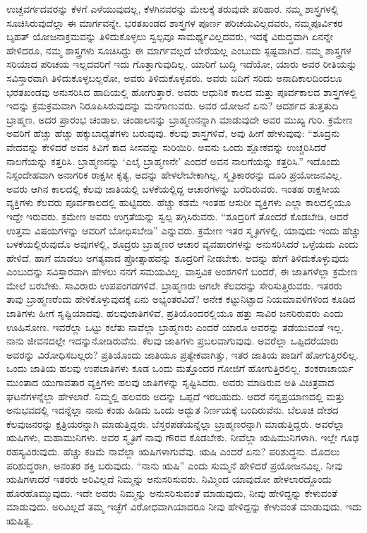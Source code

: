 ಉಚ್ಚವರ್ಗದವರನ್ನು ಕೆಳಗೆ ಎಳೆಯುವುದಲ್ಲ, ಕೆಳಗಿನವರನ್ನು ಮೇಲಕ್ಕೆ ತರುವುದೇ ಪರಿಹಾರ. ನಮ್ಮ ಶಾಸ್ತ್ರಗಳಲ್ಲಿ ಸೂಚಿಸಿರುವುದೆಲ್ಲಾ ಈ ಮಾರ್ಗವನ್ನೇ. ಭರತಖಂಡದ ಶಾಸ್ತ್ರಗಳ ಪೂರ್ಣ ಪರಿಚಯವಿಲ್ಲದವರು, ನಮ್ಮ\break ಪೂರ್ವಿಕರ ಬೃಹತ್​ ಯೋಜನಾಕ್ರಮವನ್ನು ತಿಳಿದುಕೊಳ್ಳಲು ಸ್ವಲ್ಪವೂ ಸಾಮರ್ಥ್ಯವಿಲ್ಲದವರು, ಇದಕ್ಕೆ ವಿರುದ್ಧವಾಗಿ ಏನನ್ನೇ ಹೇಳಿದರೂ, ನಮ್ಮ ಶಾಸ್ತ್ರಗಳು ಸೂಚಿಸಿದ್ದು ಈ ಮಾರ್ಗವಲ್ಲದೆ ಬೇರೆಯಲ್ಲ ಎಂಬುದು ಸ್ಪಷ್ಟವಾಗಿದೆ. ನಮ್ಮ ಶಾಸ್ತ್ರಗಳ ಸರಿಯಾದ ಪರಿಚಯ ಇಲ್ಲದವರಿಗೆ ಇದು ಗೊತ್ತಾಗುವುದಿಲ್ಲ. ಯಾರಿಗೆ ಬುದ್ಧಿ ಇದೆಯೋ, ಯಾರು ಅವರ ರೀತಿಯನ್ನು ಸವಿಸ್ತಾರವಾಗಿ ತಿಳಿದುಕೊಳ್ಳಬಲ್ಲರೋ, ಅವರು ತಿಳಿದುಕೊಳ್ಳವರು. ಅವರು ಬದಿಗೆ ಸರಿದು ಅನಾದಿಕಾಲದಿಂದಲೂ ಭರತಖಂಡವು ಅನುಸರಿಸಿದ ಹಾದಿಯಲ್ಲಿ ಹೋಗುತ್ತಾರೆ. ಅವರು ಆಧುನಿಕ ಕಾಲದ ಮತ್ತು ಪೂರ್ವಕಾಲದ ಶಾಸ್ತ್ರಗಳಲ್ಲಿ ಇದನ್ನು ಕ್ರಮಕ್ರಮವಾಗಿ ನಿರೂಪಿಸಿರುವುದನ್ನು ಮನಗಾಣುವರು. ಅವರ ಯೋಜನೆ ಏನು? ಆದರ್ಶದ ತುತ್ತತುದಿ ಬ್ರಾಹ್ಮಣ. ಅದರ ಪ್ರಾರಂಭ ಚಂಡಾಲ. ಚಂಡಾಲನನ್ನು ಬ್ರಾಹ್ಮಣನನ್ನಾಗಿ ಮಾಡುವುದೇ ಅವರ ಮುಖ್ಯ ಗುರಿ. ಕ್ರಮೇಣ ಅವರಿಗೆ ಹೆಚ್ಚು ಹೆಚ್ಚು ಹಕ್ಕುಬಾಧ್ಯತೆಗಳು ಬರುವುವು. ಕೆಲವು ಶಾಸ್ತ್ರಗಳಿವೆ, ಅವು ಹೀಗೆ ಹೇಳುವುವು: “ಶೂದ್ರನು ವೇದವನ್ನು ಕೇಳಿದರೆ ಅವನ ಕಿವಿಗೆ ಕಾದ ಸೀಸವನ್ನು ಸುರಿಯಿರಿ. ಅವನು ಒಂದು ಶ್ಲೋಕವನ್ನು ಉಚ್ಚರಿಸಿದರೆ ನಾಲಗೆಯನ್ನು ಕತ್ತರಿಸಿ. ಬ್ರಾಹ್ಮಣನನ್ನು ‘ಎಲೈ ಬ್ರಾಹ್ಮಣನೇ’ ಎಂದರೆ ಅವನ ನಾಲಗೆಯನ್ನು ಕತ್ತರಿಸಿ.” ಇದೊಂದು ನಿಸ್ಸಂದೇಹವಾಗಿ ಅನಾಗರಿಕ ರಾಕ್ಷಸೀ ಕೃತ್ಯ, ಅದನ್ನು ಹೇಳಲೇಬೇಕಾಗಿಲ್ಲ. ಸ್ಮೃತಿಕಾರರನ್ನು ದೂರಿ ಪ್ರಯೋಜನವಿಲ್ಲ. ಅವರು ಆಗಿನ ಕಾಲದಲ್ಲಿ ಕೆಲವು ಜಾತಿಯಲ್ಲಿ ಬಳಕೆಯಲ್ಲಿದ್ದ ಆಚಾರಗಳನ್ನು ಬರೆದಿರುವರು. ಇಂತಹ ರಾಕ್ಷಸೀಯ ವ್ಯಕ್ತಿಗಳು ಕೆಲವರು ಪೂರ್ವಕಾಲದಲ್ಲಿ ಹುಟ್ಟಿದರು. ಹೆಚ್ಚು ಕಡಮೆ ಇಂತಹ ಆಸುರೀ ವ್ಯಕ್ತಿಗಳು ಎಲ್ಲಾ ಕಾಲದಲ್ಲಿಯೂ ಇದ್ದೇ ಇರುವರು. ಕ್ರಮೇಣ ಅವರು ಉಗ್ರತೆಯನ್ನು ಸ್ವಲ್ಪ ತಗ್ಗಿಸಿರುವರು. “ಶೂದ್ರರಿಗೆ ತೊಂದರೆ ಕೊಡಬೇಡಿ, ಆದರೆ ಉತ್ತಮ ವಿಷಯಗಳನ್ನು ಆವರಿಗೆ ಬೋಧಿಸಬೇಡಿ” ಎನ್ನುವರು. ಕ್ರಮೇಣ ಇತರ ಸ್ಮೃತಿಗಳಲ್ಲಿ, ಯಾವುದು ಇಂದು ಹೆಚ್ಚು ಬಳಕೆಯಲ್ಲಿರುವುದೊ ಅವುಗಳಲ್ಲಿ, ಶೂದ್ರರು ಬ್ರಾಹ್ಮಣರ ಆಚಾರ ವ್ಯವಹಾರಗಳನ್ನು ಅನುಸರಿಸಿದರೆ ಒಳ್ಳೆಯದು ಎಂದು ಹೇಳಿದೆ. ಹಾಗೆ ಮಾಡಲು ಅಗತ್ಯವಾದ ಪ್ರೋತ್ಸಾಹವನ್ನು ಶೂದ್ರರಿಗೆ ನೀಡಬೇಕು. ಅದನ್ನು ಹೇಗೆ ತಿಳಿದುಕೊಳ್ಳುವುದು ಎಂಬುದನ್ನು ಸವಿಸ್ತಾರವಾಗಿ ಹೇಳಲು ನನಗೆ ಸಮಯವಿಲ್ಲ. ವಾಸ್ತವಿಕ ಅಂಶಗಳಿಗೆ ಬಂದರೆ, ಈ ಜಾತಿಗಳೆಲ್ಲಾ ಕ್ರಮೇಣ ಮೇಲೆ ಬರಬೇಕು. ಸಾವಿರಾರು ಉಪಪಂಗಡಗಳಿವೆ. ಬ್ರಾಹ್ಮಣರು ಆಗಲೇ ಕೆಲವರನ್ನು ಸೇರಿಸುತ್ತಿರುವರು. ಇತರರು ತಾವು ಬ್ರಾಹ್ಮಣರೆಂದು ಹೇಳಿಕೊಳ್ಳುವುದಕ್ಕೆ ಏನು ಅಭ್ಯಂತರವಿದೆ? ಅನೇಕ ಕಟ್ಟುನಿಟ್ಟಾದ ನಿಯಮಾವಳಿಗಳಿಂದ ಕೂಡಿದ ಜಾತಿಗಳು ಹೀಗೆ ಸೃಷ್ಟಿಯಾದವು. ಹಲವು\break ಜಾತಿಗಳಿವೆ, ಪ್ರತಿಯೊಂದರಲ್ಲಿಯೂ ಹತ್ತು ಸಾವಿರ ಜನರಿರುವರು ಎಂದು ಊಹಿಸೋಣ. ಇವರೆಲ್ಲಾ ಒಟ್ಟು ಕಲೆತು ನಾವೆಲ್ಲಾ ಬ್ರಾಹ್ಮಣರು ಎಂದರೆ ಯಾರೂ ಅವರನ್ನು ತಡೆಯುವಂತೆ ಇಲ್ಲ. ನಾನು ಜೀವನದಲ್ಲೇ ಇದನ್ನು\break ನೋಡಿರುವೆನು. ಕೆಲವು ಜಾತಿಗಳು ಪ್ರಬಲವಾಗುವುವು. ಅವರೆಲ್ಲಾ ಒಪ್ಪಿದರೆ\break ಯಾರು ಅವರನ್ನು ವಿರೋಧಿಸಬಲ್ಲರು? ಪ್ರತಿಯೊಂದು ಜಾತಿಯೂ ಪ್ರತ್ಯೇಕವಾಗಿತ್ತು, ಇತರ ಜಾತಿಯ ಪಾಡಿಗೆ ಹೋಗುತ್ತಿರಲಿಲ್ಲ. ಒಂದು ಜಾತಿಯ ಹಲವು ಉಪಜಾತಿಗಳು ಕೂಡ ಒಂದು ಮತ್ತೊಂದರ ಗೋಜಿಗೆ ಹೋಗುತ್ತಿರಲಿಲ್ಲ. ಶಂಕರಾಚಾರ್ಯ ಮುಂತಾದ ಯುಗಾವತಾರ ವ್ಯಕ್ತಿಗಳು ಹಲವು ಜಾತಿಗಳನ್ನು ಸೃಷ್ಟಿಸಿದರು. ಅವರು ಮಾಡಿರುವ ಅತಿ ವಿಚಿತ್ರವಾದ ಘಟನೆಗಳನ್ನೆಲ್ಲಾ ಹೇಳಲಾರೆ. ನಿಮ್ಮಲ್ಲಿ ಹಲವರು ಅದನ್ನು ಒಪ್ಪದೆ ಇರಬಹುದು. ಆದರೆ ನನ್ನ\break ಪ್ರಯಾಣ\-ದಲ್ಲಿ ಮತ್ತು ಅನುಭವದಲ್ಲಿ ಇದನ್ನೆಲ್ಲಾ ನಾನು ಕಂಡು ಹಿಡಿದು ಒಂದು ಅದ್ಭುತ ನಿರ್ಣಯಕ್ಕೆ ಬಂದಿರುವೆನು. ಬೆಲೂಚಿ ದೇಶದ ಕೆಲವು\break ಜನರನ್ನು ಕ್ಷತ್ರಿಯರನ್ನಾಗಿ ಮಾಡುತ್ತಿದ್ದರು. ಬೆಸ್ತರಪಡೆಯನ್ನೆಲ್ಲಾ ಬ್ರಾಹ್ಮಣ\-ರನ್ನಾಗಿ ಮಾಡುತ್ತಿದ್ದರು. ಅವರೆಲ್ಲಾ ಋಷಿಗಳು, ಮಹಾಮುನಿಗಳು. ಅವರ ಸ್ಮೃತಿಗೆ ನಾವು ಗೌರವ ಕೊಡಬೇಕು. ನೀವೆಲ್ಲಾ ಋಷಿಮುನಿಗಳಾಗಿ. ಇಲ್ಲೇ ಗೂಢ ರಹಸ್ಯವಿರುವುದು. ಹೆಚ್ಚು ಕಡಿಮೆ ನಾವೆಲ್ಲಾ ಋಷಿಗಳಾಗುವೆವು. ಋಷಿ ಎಂದರೆ ಏನು? ಪರಿಶುದ್ಧನು. ಮೊದಲು ಪರಿಶುದ್ಧರಾಗಿ, ಅನಂತರ ಶಕ್ತಿ ಬರುವುದು. “ನಾನು ಋಷಿ” ಎಂದು ಸುಮ್ಮನೆ ಹೇಳಿದರೆ ಪ್ರಯೋಜನವಿಲ್ಲ. ನೀವು ಋಷಿಗಳಾದರೆ ಇತರರು ಅರಿವಿಲ್ಲದೆ ನಿಮ್ಮನ್ನು ಅನುಸರಿಸುವರು. ನಿಮ್ಮಿಂದ ಯಾವುದೋ ಹೇಳಲಾರದ್ದೊಂದು ಹೊರಹೊಮ್ಮುವುದು. ಇದೇ ಅವರು ನಿಮ್ಮನ್ನು ಅನುಸರಿಸುವಂತೆ ಮಾಡುವುದು, ನೀವು ಹೇಳಿದ್ದನ್ನು ಕೇಳುವಂತೆ ಮಾಡುವುದು. ಅರಿವಿಲ್ಲದೆ ತಮ್ಮ ಇಚ್ಛೆಗೆ ವಿರೋಧವಾಗಿಯಾದರೂ ನೀವು ಹೇಳಿದ್ದನ್ನು ಕೇಳುವಂತೆ ಮಾಡುವುದು. ಇದು ಋಷಿತ್ವ.

